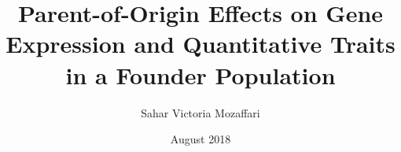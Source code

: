 \documentclass{ucetd}
\title{Parent-of-Origin Effects on Gene Expression and Quantitative Traits in a Founder Population}
\author{Sahar Victoria Mozaffari}
\date{August 2018}
\begin{document}
\maketitle

\makecopyright
\makededication


\tableofcontents
\listoffigures
\listoftables





\mainmatter











\makebibliography

%
%
\end{document}
